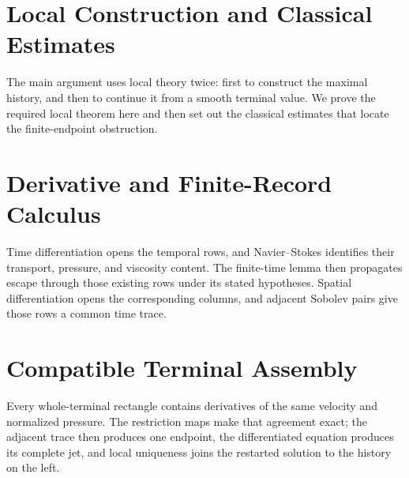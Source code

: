 \section{Local Construction and Classical Estimates}\label{app:LocalConstructionAndClassicalEstimates}

The main argument uses local theory twice: first to construct the maximal history, and then to continue it from a smooth terminal value.  We prove the required local theorem here and then set out the classical estimates that locate the finite-endpoint obstruction.




\section{Derivative and Finite-Record Calculus}\label{app:DerivativeAndFiniteRecordCalculus}\label{sec:FromCriticalHeightToCompatibleFiniteViews}

Time differentiation opens the temporal rows, and Navier--Stokes identifies their transport, pressure, and viscosity content.
The finite-time lemma then propagates escape through those existing rows under its stated hypotheses.
Spatial differentiation opens the corresponding columns, and adjacent Sobolev pairs give those rows a common time trace.








\section{Compatible Terminal Assembly}\label{app:CompatibleTerminalAssembly}\label{sec:TheCompatibleIntersectionAtTheTerminalTime}

Every whole-terminal rectangle contains derivatives of the same velocity and normalized pressure.  The restriction maps make that agreement exact; the adjacent trace then produces one endpoint, the differentiated equation produces its complete jet, and local uniqueness joins the restarted solution to the history on the left.






